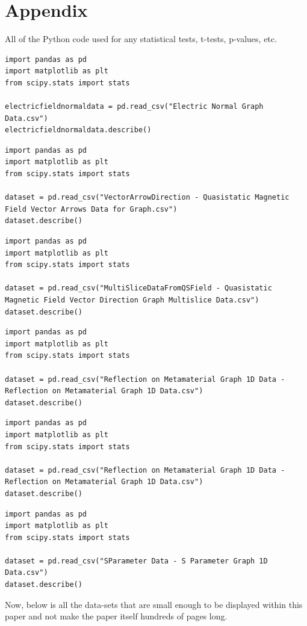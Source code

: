 \documentclass[]{article}
\begin{document}
\section*{Appendix}
All of the Python code used for any statistical tests, t-tests, p-values, etc.
\begin{lstlisting}
import pandas as pd
import matplotlib as plt
from scipy.stats import stats

electricfieldnormaldata = pd.read_csv("Electric Normal Graph Data.csv")
electricfieldnormaldata.describe()
\end{lstlisting}
\begin{lstlisting}
import pandas as pd
import matplotlib as plt
from scipy.stats import stats

dataset = pd.read_csv("VectorArrowDirection - Quasistatic Magnetic Field Vector Arrows Data for Graph.csv")
dataset.describe()
\end{lstlisting}
\begin{lstlisting}
import pandas as pd
import matplotlib as plt
from scipy.stats import stats

dataset = pd.read_csv("MultiSliceDataFromQSField - Quasistatic Magnetic Field Vector Direction Graph Multislice Data.csv")
dataset.describe()
\end{lstlisting}
\begin{lstlisting}
import pandas as pd
import matplotlib as plt
from scipy.stats import stats

dataset = pd.read_csv("Reflection on Metamaterial Graph 1D Data - Reflection on Metamaterial Graph 1D Data.csv")
dataset.describe()
\end{lstlisting}
\begin{lstlisting}
import pandas as pd
import matplotlib as plt
from scipy.stats import stats

dataset = pd.read_csv("Reflection on Metamaterial Graph 1D Data - Reflection on Metamaterial Graph 1D Data.csv")
dataset.describe()
\end{lstlisting}
\begin{lstlisting}
import pandas as pd
import matplotlib as plt
from scipy.stats import stats

dataset = pd.read_csv("SParameter Data - S Parameter Graph 1D Data.csv")
dataset.describe()
\end{lstlisting}
Now, below is all the data-sets that are small enough to be displayed within this paper and not make the paper itself hundreds of pages long. 
\end{document}
